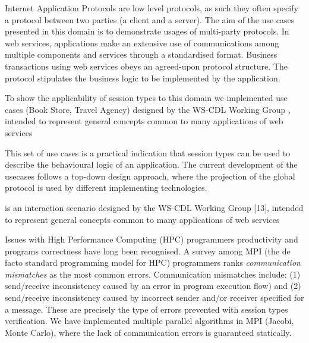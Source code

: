 



Internet Application Protocols are low level protocols, as such they often specify a protocol between two parties (a client and a server). The aim of the use cases presented in this domain is to demonstrate usages of multi-party protocols. In web services, applications make an extensive use of communications among multiple components and services through a standardised format. Business transactions using web services
obeys an agreed-upon protocol structure. The protocol stipulates the business logic to be implemented by the application.

To show the applicability of session types to this domain we implemented use cases (Book Store, Travel Agency) designed
by the WS-CDL Working Group \cite{W3C}, intended to represent general concepts common to many applications of web services

This set of use cases is a practical indication that session types can be used to describe the behavioural logic of an application. The current development of the usecases follows a top-down design approach, where the projection of the global protocol is used by different
implementing technologies.

is an interaction scenario designed
by the WS-CDL Working Group [13], intended to represent general concepts
common to many applications of web services

 Issues with High Performance Computing (HPC) programmers productivity and programs correctness have long been recognised. A survey among MPI (the de facto standard programming model for HPC) programmers \cite{MPIErrors} ranks \textit{communication mismatches} as the most common errors. Communication mismatches include: (1) send/receive inconsistency caused by an error in program execution flow) and (2) send/receive inconsistency caused by incorrect sender and/or receiver specified for a message. These are precisely the type of errors prevented with session types verification. We have implemented multiple parallel algorithms in MPI (Jacobi, Monte Carlo), where the lack of communication errors is guaranteed statically.    

